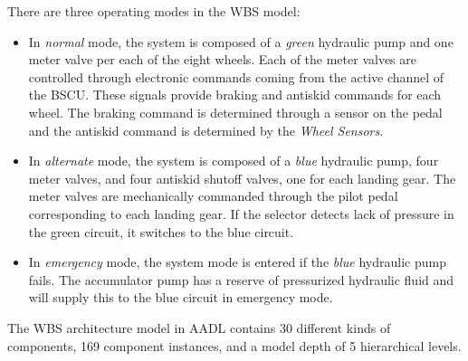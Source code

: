 There are three operating modes in the WBS model:

\begin{itemize}
	\renewcommand{\labelitemi}{\textbullet}
	\item In \textit{normal} mode, the system is composed of a \textit{green} hydraulic pump and one meter valve per each of the eight wheels. Each of the meter valves are controlled through electronic commands coming from the active channel of the BSCU. These signals provide braking and antiskid commands for each wheel. The braking command is determined through a sensor on the pedal and the antiskid command is determined by the \textit{Wheel Sensors}. 
	\item In \textit{alternate} mode, the system is composed of a \textit{blue} hydraulic pump, four meter valves, and four antiskid shutoff valves, one for each landing gear. The meter valves are mechanically commanded through the pilot pedal corresponding to each landing gear. If the selector detects lack of pressure in the green circuit, it switches to the blue circuit. 
	\item In \textit{emergency} mode, the system mode is entered if the \textit{blue} hydraulic pump fails. The accumulator pump has a reserve of pressurized hydraulic fluid and will supply this to the blue circuit in emergency mode. 
\end{itemize}

The WBS architecture model in AADL contains 30 different kinds of components, 169 component instances, and a model depth of 5 hierarchical levels. 





